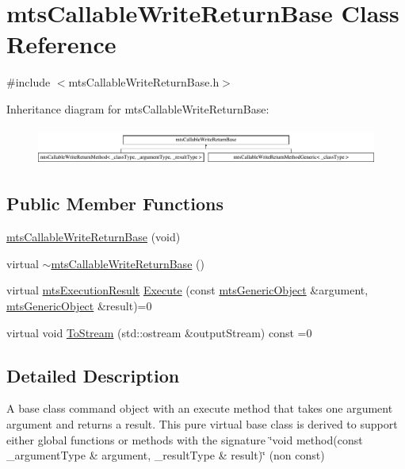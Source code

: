 \hypertarget{classmts_callable_write_return_base}{\section{mts\-Callable\-Write\-Return\-Base Class Reference}
\label{classmts_callable_write_return_base}
}


{\ttfamily \#include $<$mts\-Callable\-Write\-Return\-Base.\-h$>$}

Inheritance diagram for mts\-Callable\-Write\-Return\-Base\-:\begin{figure}[H]
\begin{center}
\leavevmode
\includegraphics[height=1.241685cm]{dd/de4/classmts_callable_write_return_base}
\end{center}
\end{figure}
\subsection*{Public Member Functions}
\begin{DoxyCompactItemize}
\item 
\hyperlink{classmts_callable_write_return_base_a74a9331e5d5a433d39c57d3230c77cf0}{mts\-Callable\-Write\-Return\-Base} (void)
\item 
virtual \hyperlink{classmts_callable_write_return_base_a98d1e91ce6aa2b01eba517add581227a}{$\sim$mts\-Callable\-Write\-Return\-Base} ()
\item 
virtual \hyperlink{classmts_execution_result}{mts\-Execution\-Result} \hyperlink{classmts_callable_write_return_base_a27af887e0c24f638cc8e21f1bf749065}{Execute} (const \hyperlink{classmts_generic_object}{mts\-Generic\-Object} \&argument, \hyperlink{classmts_generic_object}{mts\-Generic\-Object} \&result)=0
\item 
virtual void \hyperlink{classmts_callable_write_return_base_a56bfb09f0ebff160d2930f1c8521fe0e}{To\-Stream} (std\-::ostream \&output\-Stream) const =0
\end{DoxyCompactItemize}


\subsection{Detailed Description}
A base class command object with an execute method that takes one argument argument and returns a result. This pure virtual base class is derived to support either global functions or methods with the signature \char`\"{}void method(const \-\_\-argument\-Type \& argument,
\-\_\-result\-Type \& result)\char`\"{} (non const) 

